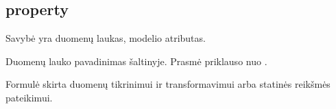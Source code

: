 \documentclass[letterpaper,10pt,lithuanian]{sphinxmanual}
\begin{document}
\subsection{property}
\label{\detokenize{dimensijos:property}}\label{\detokenize{dimensijos:id7}}\label{\detokenize{dimensijos:module-property}}
\sphinxAtStartPar
Savybė yra duomenų laukas, modelio atributas.

\begin{fulllineitems}
\label{\detokenize{dimensijos:property.source}}
\pysigstartsignatures
\pysigline
{}
\pysigstopsignatures
\sphinxAtStartPar
Duomenų lauko pavadinimas šaltinyje. Prasmė priklauso nuo
{\hyperref[\detokenize{dimensijos:resource.type}]{}}.

\end{fulllineitems}


\begin{fulllineitems}
\label{\detokenize{dimensijos:property.prepare}}
\pysigstartsignatures
\pysigline
{}
\pysigstopsignatures
\sphinxAtStartPar
Formulė skirta duomenų tikrinimui ir transformavimui arba statinės reikšmės
pateikimui.

\end{fulllineitems}

\end{document}
